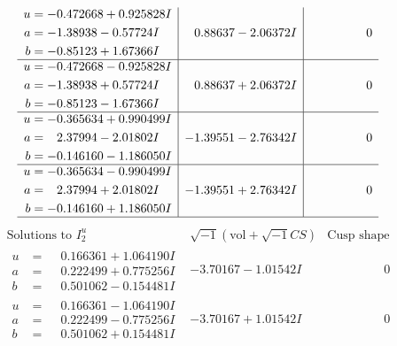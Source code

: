 \documentclass[1p]{elsarticle_modified}
\theoremstyle{definition}
\newcommand{\I}{\sqrt{-1}}
\begin{document}
$$\begin{array}{c|c|c}
\begin{aligned}
u &= -0.472668 + 0.925828 I \\
a &= -1.38938 - 0.57724 I \\
b &= -0.85123 + 1.67366 I\end{aligned}
 & \phantom{-}0.88637 - 2.06372 I & \phantom{-0.000000 } 0 \\ \hline\begin{aligned}
u &= -0.472668 - 0.925828 I \\
a &= -1.38938 + 0.57724 I \\
b &= -0.85123 - 1.67366 I\end{aligned}
 & \phantom{-}0.88637 + 2.06372 I & \phantom{-0.000000 } 0 \\ \hline\begin{aligned}
u &= -0.365634 + 0.990499 I \\
a &= \phantom{-}2.37994 - 2.01802 I \\
b &= -0.146160 - 1.186050 I\end{aligned}
 & -1.39551 - 2.76342 I & \phantom{-0.000000 } 0 \\ \hline\begin{aligned}
u &= -0.365634 - 0.990499 I \\
a &= \phantom{-}2.37994 + 2.01802 I \\
b &= -0.146160 + 1.186050 I\end{aligned}
 & -1.39551 + 2.76342 I & \phantom{-0.000000 } 0\\
 \hline 
 \end{array}$$\newpage$$\begin{array}{c|c|c}  
\text{Solutions to }I^u_{2}& \I (\text{vol} + \sqrt{-1}CS) & \text{Cusp shape}\\
 \hline 
\begin{aligned}
u &= \phantom{-}0.166361 + 1.064190 I \\
a &= \phantom{-}0.222499 + 0.775256 I \\
b &= \phantom{-}0.501062 - 0.154481 I\end{aligned}
 & -3.70167 - 1.01542 I & \phantom{-0.000000 } 0 \\ \hline\begin{aligned}
u &= \phantom{-}0.166361 - 1.064190 I \\
a &= \phantom{-}0.222499 - 0.775256 I \\
b &= \phantom{-}0.501062 + 0.154481 I\end{aligned}
 & -3.70167 + 1.01542 I & \phantom{-0.000000 } 0 \\ \hline\begin{aligned}

\end{aligned}
\end{array}$$
\end{document}
